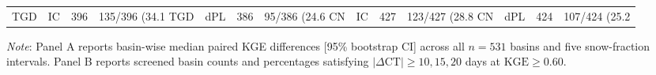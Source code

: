 \begin{table}[t]
\begin{threeparttable}
\begin{tabular}{lcccccc}
TGD & IC & 396 & 135/396 (34.1%
TGD & dPL & 386 & 95/386 (24.6%
CN & IC & 427 & 123/427 (28.8%
CN & dPL & 424 & 107/424 (25.2%
\bottomrule
\end{tabular}
\begin{tablenotes}[flushleft]
\small
\item \textit{Note}: Panel A reports basin-wise median paired KGE differences [95\% bootstrap CI] across all $n = 531$ basins and five snow-fraction intervals. Panel B reports screened basin counts and percentages satisfying $|\Delta\text{CT}| \ge 10, 15, 20$ days at $\text{KGE} \ge 0.60$.
\end{tablenotes}
\end{threeparttable}
\end{table}

